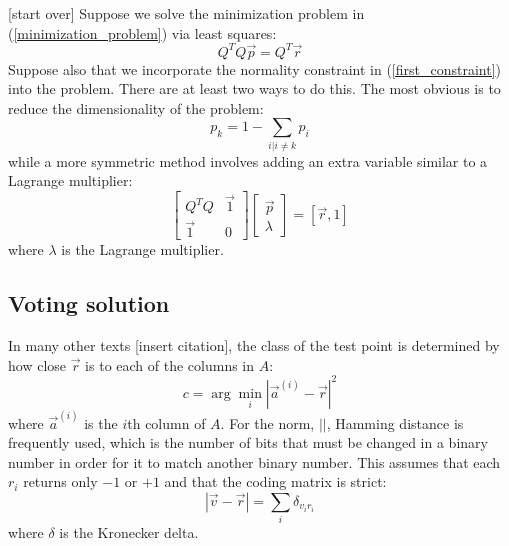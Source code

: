 \documentclass{article}
\begin{document}
[start over]
Suppose we solve the minimization problem in (\ref{minimization_problem})
via least squares:
\begin{equation}
	Q^T Q \vec p = Q^T \vec r
\end{equation}
Suppose also that we incorporate the normality constraint in (\ref{first_constraint}) into the problem. There are at least two ways to do this. The most
obvious is to reduce the dimensionality of the problem:
\begin{equation}
	p_k = 1 - \sum_{i|i \ne k} p_i
\end{equation}
while a more symmetric method involves adding an extra variable similar to
a Lagrange multiplier:
\begin{equation}
	\begin{bmatrix}
		Q^T Q & \vec 1 \\
		\vec 1 & 0
	\end{bmatrix}
	\begin{bmatrix}
		\vec p\\
		\lambda
	\end{bmatrix}
	= [\vec r, 1]
\end{equation}
where $\lambda$ is the Lagrange multiplier.


\subsection{Voting solution}

In many other texts [insert citation], the class of the test point is determined by how close $\vec r$
is to each of the columns in $A$:
\begin{equation}
	c = \arg \min_i |\vec a^{(i)} - \vec r|^2
\end{equation}
where $\vec a^{(i)}$ is the $i$th column of $A$. 
For the norm, $||$, Hamming distance is
frequently used, which is the number of bits that must be changed
in a binary number in order for it to match another binary number.
This assumes that each $r_i$ returns only $-1$ or $+1$ and that
the coding matrix is strict:
\begin{equation}
|\vec v - \vec r| = \sum_i \delta_{v_i r_i}
\end{equation}
where $\delta$ is the Kronecker delta. 
\end{document}
